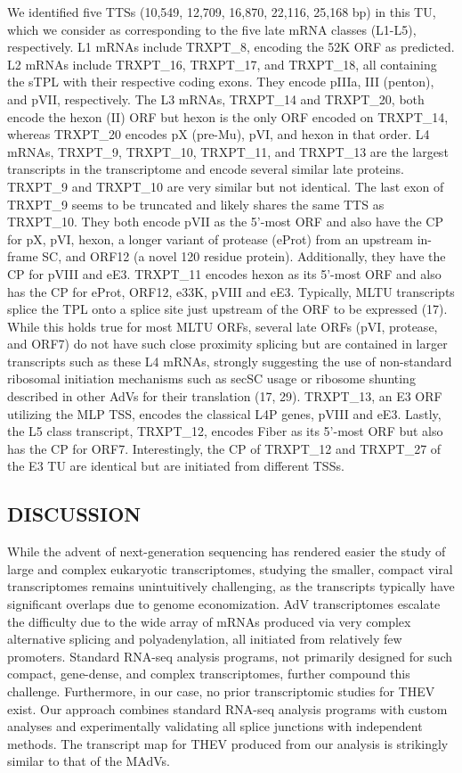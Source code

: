 \documentclass[
]{article}
\begin{document}
We identified five TTSs (10,549, 12,709, 16,870, 22,116, 25,168 bp) in
this TU, which we consider as corresponding to the five late mRNA
classes (L1-L5), respectively. L1 mRNAs include TRXPT\_8, encoding the
52K ORF as predicted. L2 mRNAs include TRXPT\_16, TRXPT\_17, and
TRXPT\_18, all containing the sTPL with their respective coding exons.
They encode pIIIa, III (penton), and pVII, respectively. The L3 mRNAs,
TRXPT\_14 and TRXPT\_20, both encode the hexon (II) ORF but hexon is the
only ORF encoded on TRXPT\_14, whereas TRXPT\_20 encodes pX (pre-Mu),
pVI, and hexon in that order. L4 mRNAs, TRXPT\_9, TRXPT\_10, TRXPT\_11,
and TRXPT\_13 are the largest transcripts in the transcriptome and
encode several similar late proteins. TRXPT\_9 and TRXPT\_10 are very
similar but not identical. The last exon of TRXPT\_9 seems to be
truncated and likely shares the same TTS as TRXPT\_10. They both encode
pVII as the 5'-most ORF and also have the CP for pX, pVI, hexon, a
longer variant of protease (eProt) from an upstream in-frame SC, and
ORF12 (a novel 120 residue protein). Additionally, they have the CP for
pVIII and eE3. TRXPT\_11 encodes hexon as its 5'-most ORF and also has
the CP for eProt, ORF12, e33K, pVIII and eE3. Typically, MLTU
transcripts splice the TPL onto a splice site just upstream of the ORF
to be expressed (17). While this holds true for most MLTU ORFs, several
late ORFs (pVI, protease, and ORF7) do not have such close proximity
splicing but are contained in larger transcripts such as these L4 mRNAs,
strongly suggesting the use of non-standard ribosomal initiation
mechanisms such as secSC usage or ribosome shunting described in other
AdVs for their translation (17, 29). TRXPT\_13, an E3 ORF utilizing the
MLP TSS, encodes the classical L4P genes, pVIII and eE3. Lastly, the L5
class transcript, TRXPT\_12, encodes Fiber as its 5'-most ORF but also
has the CP for ORF7. Interestingly, the CP of TRXPT\_12 and TRXPT\_27 of
the E3 TU are identical but are initiated from different TSSs. \newpage

\subsection{DISCUSSION}\label{discussion}

While the advent of next-generation sequencing has rendered easier the
study of large and complex eukaryotic transcriptomes, studying the
smaller, compact viral transcriptomes remains unintuitively challenging,
as the transcripts typically have significant overlaps due to genome
economization. AdV transcriptomes escalate the difficulty due to the
wide array of mRNAs produced via very complex alternative splicing and
polyadenylation, all initiated from relatively few promoters. Standard
RNA-seq analysis programs, not primarily designed for such compact,
gene-dense, and complex transcriptomes, further compound this challenge.
Furthermore, in our case, no prior transcriptomic studies for THEV
exist. Our approach combines standard RNA-seq analysis programs with
custom analyses and experimentally validating all splice junctions with
independent methods. The transcript map for THEV produced from our
analysis is strikingly similar to that of the MAdVs.
\end{document}
